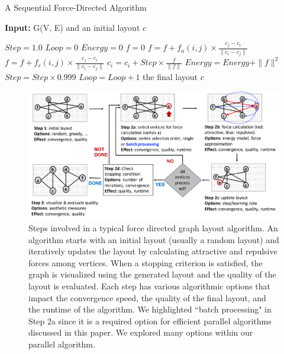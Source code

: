 \documentclass{vgtc}
\begin{document}
\begin{algorithm}[t]
\caption{A Sequential Force-Directed Algorithm}\label{euclid}
\hspace*{\algorithmicindent} \textbf{Input:} G(V, E) and an initial layout $c$
\begin{algorithmic}[1]
\State $Step = 1.0$ 
\State $Loop = 0$
\State $Energy = 0$
    \State $f = 0$ 
                \State $f= f+ f_a(i,j)\times \frac{c_j - c_i}{\parallel c_i - c_j\parallel}$
            \Else 
                \State $f = f + f_r(i,j)\times \frac{c_j - c_i}{\parallel c_i - c_j\parallel}$
            \EndIf
        \EndFor
        \State $c_i = c_i + Step \times \frac{f}{\parallel f\parallel}$ 
        \State $Energy = Energy + \parallel f \parallel^2$
    \EndFor
\State $Step = Step \times 0.999$
\State $Loop = Loop + 1$
\EndWhile
\State \Return the final layout $c$
\end{algorithmic}
\label{algo:sequential}
\vspace{-0.7cm}
\end{algorithm}


\begin{figure}[h]
    \centering
    \includegraphics[width=0.9\linewidth]{figures/Force_directeed_flow}
    \vspace{-0.5cm}
    \caption{Steps involved in a typical force directed graph layout algorithm. An algorithm starts with an initial layout (usually a random layout) and iteratively updates the layout by calculating attractive and repulsive forces among vertices. When a stopping criterion is satisfied, the graph is visualized using the generated layout and the quality of the layout is evaluated. Each step has various algorithmic options that impact the convergence speed, the quality of the final layout, and the runtime of the algorithm. We highlighted ``batch processing" in Step 2a since it is a required option for efficient parallel algorithms discussed in this paper. We explored many options within our parallel algorithm.}
    \vspace{-0.4cm}
    \label{fig:batchlayoutsystem}
\end{figure}
\end{document}
